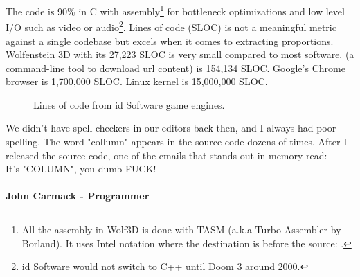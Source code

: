 \documentclass[book.tex]{subfiles}
\begin{document}
\par
 The code is 90\% in C with assembly\footnote{All the assembly in Wolf3D is done with TASM (a.k.a Turbo Assembler by Borland). It uses Intel notation where the destination is before the source:   .} for bottleneck optimizations and low level I/O such as video or audio\footnote{id Software would not switch to C++ until Doom 3 around 2000.}. Lines of code (SLOC) is not a meaningful metric against a single codebase but excels when it comes to extracting proportions. Wolfenstein 3D with its 27,223 SLOC is very small compared to most software.  (a command-line tool to download url content) is 154,134 SLOC. Google's Chrome browser is 1,700,000 SLOC. Linux kernel is 15,000,000 SLOC.\\
\par
\begin{figure}[H]
\centering
   \caption{Lines of code from id Software game engines.}
 \end{figure}
 
\par

 \begin{fancyquotes}
   We didn't have spell checkers in our editors back then, and I always had poor spelling.  The word "collumn" appears in the source code dozens of times.  After I released the source code, one of the emails that stands out in memory read:
 \bigskip \\
It's "COLUMN", you dumb FUCK!\\
 \bigskip \\
\textbf{John Carmack - Programmer}
 \end{fancyquotes}
 
\end{document}
